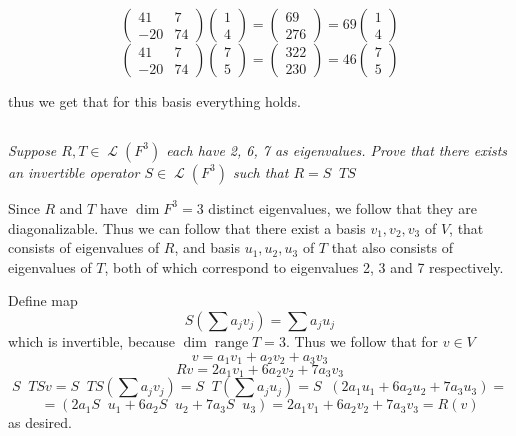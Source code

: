 \documentclass[11pt,oneside,titlepage]{book}
\DeclareMathOperator \map {\mathcal {L}}
\DeclareMathOperator \range {range}
\DeclareMathOperator \inv {^{-1}}
\begin{document}
$$
\begin{pmatrix}  41 & 7 \\
  -20 & 74
\end{pmatrix}
\begin{pmatrix}
  1 \\
  4
\end{pmatrix}
=
\begin{pmatrix}
  69 \\
  276
\end{pmatrix}
=
69
\begin{pmatrix}
  1 \\
  4
\end{pmatrix}
$$
$$
\begin{pmatrix}
  41 & 7 \\
  -20 & 74
\end{pmatrix}
\begin{pmatrix}
  7 \\
  5
\end{pmatrix}
=
\begin{pmatrix}
  322 \\
  230
\end{pmatrix}
=
46
\begin{pmatrix}
  7 \\
  5
\end{pmatrix}
$$

thus we get that for this basis  everything holds.

\subsection{}

\textit{Suppose $R, T \in \map(F^3)$ each have 2, 6, 7 as eigenvalues. Prove that there exists
  an invertible operator $S \in \map(F^3)$ such that $R = S \inv T S$}

Since $R$ and $T$ have $\dim F^3 = 3$ distinct eigenvalues, we follow that they are diagonalizable.
Thus we can follow that there exist a basis $v_1, v_2, v_3$ of $V$, that consists of eigenvalues
of $R$, and basis $u_1, u_2, u_3$ of $T$ that also consists of eigenvalues of $T$, both of
which correspond to eigenvalues 2, 3 and 7 respectively.

Define map
$$S(\sum a_j v_j) = \sum a_j u_j$$
which is invertible, because $\dim \range T = 3$. Thus we follow that for $v \in V$
$$v = a_1 v_1 + a_2 v_2 + a_3 v_3 $$ 
$$Rv = 2 a_1 v_1 + 6 a_2 v_2 + 7 a_3 v_3 $$ 
$$S \inv T S v = S \inv T S (\sum a_j v_j) =  S \inv T (\sum a_j u_j) = S \inv (2 a_1 u_1 +
6 a_2 u_2 + 7 a_3 u_3) = $$
$$ = (2 a_1 S \inv u_1 + 6 a_2 S \inv u_2 + 7 a_3 S \inv u_3) = 2 a_1 v_1 + 6 a_2 v_2 + 7 a_3 v_3 =
R(v)$$
as desired.
\end{document}
